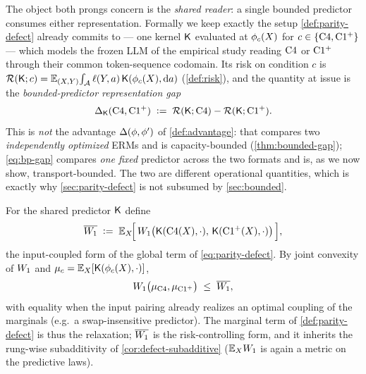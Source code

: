 The object both prongs concern is the \emph{shared reader}: a single bounded
predictor consumes either representation. Formally we keep exactly the setup
\cref{def:parity-defect} already commits to --- one kernel $\mathsf{K}$ evaluated
at $\phi_c(X)$ for $c\in\{\mathrm{C}4,\mathrm{C1^{+}}\}$ --- which models the frozen
LLM of the empirical study reading $\mathrm{C}4$ or $\mathrm{C1^{+}}$ through their
common token-sequence codomain. Its risk on condition $c$ is
$\mathcal{R}(\mathsf{K};c)=\mathbb{E}_{(X,Y)}\!\int_{\mathcal{A}}\ell(Y,a)\,\mathsf{K}(\phi_c(X),\mathrm{d}a)$
(\cref{def:risk}), and the quantity at issue is the
\emph{bounded-predictor representation gap}
\begin{equation}
  \label{eq:bp-gap}
  \Delta_{\mathsf{K}}(\mathrm{C}4,\mathrm{C1^{+}})
  \;\vcentcolon=\;
  \mathcal{R}(\mathsf{K};\mathrm{C}4)-\mathcal{R}(\mathsf{K};\mathrm{C1^{+}}).
\end{equation}
This is \emph{not} the advantage $\Delta(\phi,\phi')$ of \cref{def:advantage}:
that compares two \emph{independently optimized} ERMs and is capacity-bounded
(\cref{thm:bounded-gap}); \eqref{eq:bp-gap} compares \emph{one fixed} predictor
across the two formats and is, as we now show, transport-bounded. The two are
different operational quantities, which is exactly why \cref{sec:parity-defect}
is not subsumed by \cref{sec:bounded}.

\begin{definition}
\label{def:coupled-transport}
For the shared predictor $\mathsf{K}$ define
\begin{equation}
  \label{eq:coupled-transport}
  \overline{W_{1}}
  \;\vcentcolon=\;
  \mathbb{E}_X\!\Big[\,
    W_{1}\big(\mathsf{K}(\mathrm{C}4(X),\cdot),\,\mathsf{K}(\mathrm{C1^{+}}(X),\cdot)\big)
  \,\Big],
\end{equation}
the input-coupled form of the global term of \eqref{eq:parity-defect}. By joint
convexity of $W_{1}$ \citep[Thm.~4.8]{villani2009} and
$\mu_{c}=\mathbb{E}_X[\mathsf{K}(\phi_c(X),\cdot)]$,
\begin{equation}
  \label{eq:marginal-le-coupled}
  W_{1}\big(\mu_{\mathrm{C}4},\mu_{\mathrm{C1^{+}}}\big)\;\le\;\overline{W_{1}},
\end{equation}
with equality when the input pairing already realizes an optimal coupling of the
marginals (e.g.\ a swap-insensitive predictor). The marginal term of
\cref{def:parity-defect} is thus the relaxation; $\overline{W_{1}}$ is the
risk-controlling form, and it inherits the rung-wise subadditivity of
\cref{cor:defect-subadditive} ($\mathbb{E}_XW_{1}$ is again a metric on the
predictive laws).
\end{definition}

